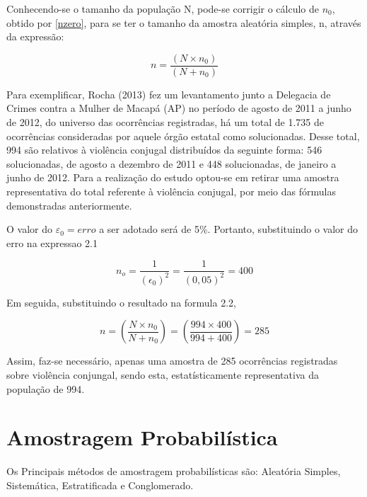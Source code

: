 Conhecendo-se o tamanho da população N, pode-se corrigir o cálculo de $n_{0}$, obtido por \ref{nzero}, para se ter o tamanho da amostra aleatória simples, n, através da expressão:


\begin{equation}\label{nzero2}
    n=\frac{\left(N \times n_{0}\right)}{\left(N + n_{0}\right)}
\end{equation}


Para exemplificar, Rocha (2013) fez um levantamento junto a
Delegacia de Crimes contra a Mulher de Macapá (AP) no  período de
agosto de 2011 a junho de 2012, do universo das ocorrências
registradas, há um total de 1.735 de ocorrências consideradas por
aquele órgão estatal como solucionadas. Desse total, 994 são
relativos à violência conjugal distribuídos da seguinte forma: 546
solucionadas, de agosto a dezembro de 2011 e 448 solucionadas, de
janeiro a junho de 2012. Para a realização do estudo optou-se em
retirar uma amostra representativa do total referente à violência
conjugal, por meio das fórmulas demonstradas anteriormente.

\vskip0.3cm


O valor do $\varepsilon_{0}=erro$ a ser adotado será de 5\%.
Portanto, substituindo o valor do erro na expressao 2.1

\begin{equation}\label{nzero}
    n_{o}=\frac{1}{\left(\epsilon_{0}\right)^2}=\frac{1}{\left(0,05
    \right)^2}=400
\end{equation}

Em seguida, substituindo o resultado na formula 2.2,

\begin{equation}\label{nzero2}
    n=\left(\frac{N \times n_{0}}{N + n_{0}}\right)=
    \left(\frac{994 \times 400}{994 + 400}\right)=285
\end{equation}

Assim, faz-se necessário, apenas uma amostra de 285 ocorrências
registradas sobre violência conjungal, sendo esta,
estatísticamente representativa da população de 994.








\section{Amostragem Probabilística}
\inic  Os Principais métodos de amostragem probabilísticas são: Aleatória Simples, Sistemática, Estratificada e Conglomerado.

